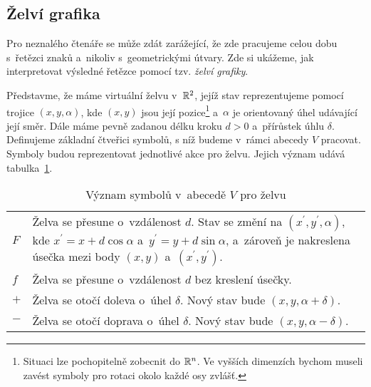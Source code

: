 \subsection{Želví grafika}\label{subsec:zelvi-grafika}

Pro neznalého čtenáře se může zdát zarážející, že zde pracujeme celou dobu s~řetězci znaků a~nikoliv s~geometrickými útvary. Zde si ukážeme, jak interpretovat výsledné řetězce pomocí tzv. \emph{želví grafiky}.

Představme, že máme virtuální želvu v~$\mathbb{R}^2$, jejíž stav reprezentujeme pomocí trojice $(x,y,\alpha)$, kde $(x,y)$ jsou její pozice\footnote{Situaci lze pochopitelně zobecnit do $\mathbb{R}^n$. Ve vyšších dimenzích bychom museli zavést symboly pro rotaci okolo každé osy zvlášť.} a~$\alpha$ je orientovaný úhel udávající její směr. Dále máme pevně zadanou délku kroku $d>0$ a~přírůstek úhlu $\delta$. Definujeme základní čtveřici symbolů, s níž budeme v~rámci abecedy $V$ pracovat. Symboly budou reprezentovat jednotlivé akce pro želvu. Jejich význam udává tabulka~\ref{table:vyznam-symbolu-zelva}.
\begin{table}[h]
    \centering
    \begin{tabular}{lp{}}
        $F$ & Želva se přesune o~vzdálenost $d$. Stav se změní na $(x^\prime,y^\prime,\alpha)$, kde $x^\prime=x+d\cos\alpha$ a~$y^\prime=y+d\sin\alpha$, a~zároveň je nakreslena úsečka mezi body $(x,y)$ a~$(x^\prime,y^\prime)$.\\
        $f$ & Želva se přesune o~vzdálenost $d$ bez kreslení úsečky.\\
        $+$ & Želva se otočí doleva o~úhel $\delta$. Nový stav bude $(x,y,\alpha+\delta)$.\\
        $-$ & Želva se otočí doprava o~úhel $\delta$. Nový stav bude $(x,y,\alpha-\delta)$.
    \end{tabular}
    \caption{Význam symbolů v~abecedě $V$ pro želvu}
    \label{table:vyznam-symbolu-zelva}
\end{table}

